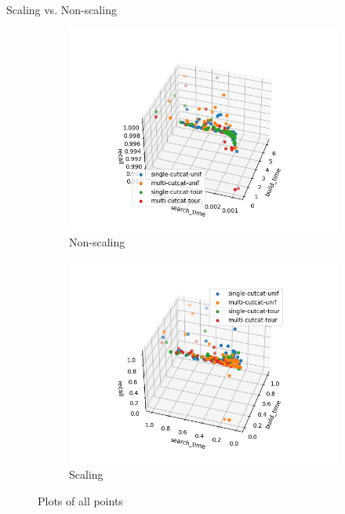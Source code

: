 \begin{frame}{Scaling vs. Non-scaling}
    \begin{figure}
        \centering
        \hfill
        \begin{subfigure}{0.49\textwidth}
            \includegraphics[width=\textwidth]{../images/report/non-scaling.png}
            \caption{Non-scaling}
        \end{subfigure}
        \hfill
        \begin{subfigure}{0.49\textwidth}
            \includegraphics[width=\textwidth]{../images/report/scaling.png}
            \caption{Scaling}
        \end{subfigure}
        \caption{Plots of all points}
    \end{figure}
\end{frame}

